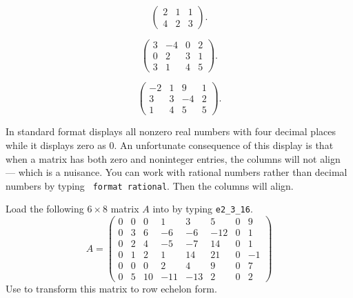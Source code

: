 \begin{exercise} \label{c2.3.1a}
\[
\left(\begin{array}{rrr}
 2 &  1  &  1   \\
 4 &  2  &  3
\end{array}\right).
\]
\end{exercise}
\begin{exercise} \label{c2.3.1b}
\[
\left(\begin{array}{rrrr}
 3  & -4 & 0 & 2\\
 0  &  2 & 3 & 1\\
 3  &  1 & 4 & 5
\end{array}\right).
\]
\end{exercise}
\begin{exercise} \label{c2.3.1c}
\[
\left(\begin{array}{rrrr}
 -2 & 1 &  9 & 1\\
  3 & 3 & -4 & 2\\
  1 & 4 &  5 & 5
\end{array}\right).
\]
\end{exercise}

 {\rm In standard format \Matlab displays
all nonzero real numbers with four decimal places while it displays
zero as $0$.  An unfortunate consequence of this display is that
when a matrix has both zero and noninteger entries, the columns
will not align --- which is a nuisance.  You can work with
rational numbers rather than decimal numbers by typing {\tt
format rational}.  Then the columns will align.}

\begin{exercise} \label{c2.3.2}
Load the following $6\times 8$ matrix $A$ into \Matlab by typing
{\tt e2\_3\_16}.
\begin{equation*}
A=\left(\begin{array}{rrrrrrrr}
0 & 0 &  0 &   1 &   3 &   5 & 0 &  9 \\
0 & 3 &  6 &  -6 &  -6 & -12 & 0 &  1 \\
0 & 2 &  4 &  -5 &  -7 &  14 & 0 &  1 \\
0 & 1 &  2 &   1 &  14 &  21 & 0 & -1 \\
0 & 0 &  0 &   2 &   4 &   9 & 0 &  7 \\
0 & 5 & 10 & -11 & -13 &   2 & 0 &  2
\end{array}\right)
\end{equation*}
Use \Matlab to transform this matrix to row echelon form.
\end{exercise}

